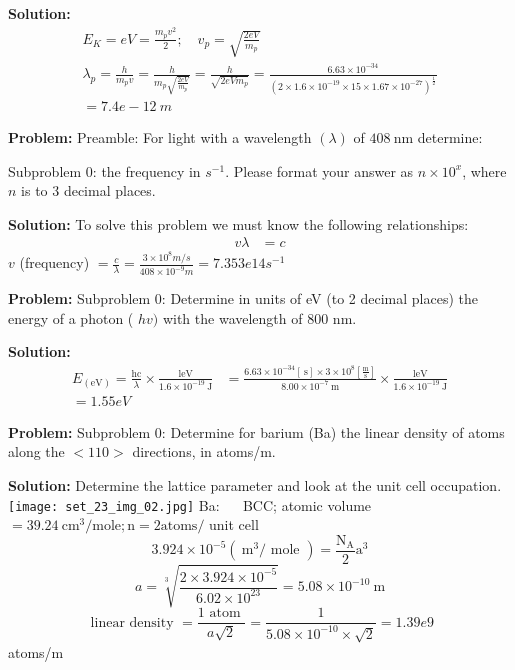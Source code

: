 \documentclass[10pt]{article}
\begin{document}
\textbf{Solution:}
\[
\begin{gathered}
E_{{K}}={eV}=\frac{{m}_{{p}} {v}^{2}}{2} ; \quad {v}_{{p}}=\sqrt{\frac{2 {eV}}{{m}_{{p}}}} \\
\lambda_{{p}}=\frac{{h}}{{m}_{{p}} {v}}=\frac{{h}}{{m}_{{p}} \sqrt{\frac{2 {eV}}{{m}_{{p}}}}}=\frac{{h}}{\sqrt{2 {eVm_{p }}}}=\frac{6.63 \times 10^{-34}}{\left(2 \times 1.6 \times 10^{-19} \times 15 \times 1.67 \times 10^{-27}\right)^{\frac{1}{2}}}
\\
= \boxed{7.4e-12} {~m}
\end{gathered}
\]


\textbf{Problem:}
Preamble: For light with a wavelength $(\lambda)$ of $408 \mathrm{~nm}$ determine:

Subproblem 0: the frequency in $s^{-1}$. Please format your answer as $n \times 10^x$, where $n$ is to 3 decimal places. 


\textbf{Solution:}
To solve this problem we must know the following relationships:
\[
\begin{aligned}
v \lambda &=c
\end{aligned}
\]
$v$ (frequency) $=\frac{c}{\lambda}=\frac{3 \times 10^{8} m / s}{408 \times 10^{-9} m}= \boxed{7.353e14} s^{-1}$


\textbf{Problem:}
Subproblem 0: Determine in units of eV (to 2 decimal places) the energy of a photon ( $h v)$ with the wavelength of $800$ nm.


\textbf{Solution:}
\[
\begin{aligned}
E_{(\mathrm{eV})}=\frac{\mathrm{hc}}{\lambda} \times \frac{\mathrm{leV}}{1.6 \times 10^{-19} \mathrm{~J}} &=\frac{6.63 \times 10^{-34}[\mathrm{~s}] \times 3 \times 10^{8}\left[\frac{\mathrm{m}}{\mathrm{s}}\right]}{8.00 \times 10^{-7} \mathrm{~m}} \times \frac{\mathrm{leV}}{1.6 \times 10^{-19} \mathrm{~J}} \\
=\boxed{1.55} eV
\end{aligned}
\]


\textbf{Problem:}
Subproblem 0: Determine for barium (Ba) the linear density of atoms along the $<110>$ directions, in atoms/m.


\textbf{Solution:}
Determine the lattice parameter and look at the unit cell occupation.
\texttt{[image: set\_23\_img\_02.jpg]}
\nonessentialimage
Ba: $\quad$ BCC; atomic volume $=39.24 \mathrm{~cm}^{3} / \mathrm{mole} ; \mathrm{n}=2 \mathrm{atoms} /$ unit cell\\
$$
3.924 \times 10^{-5}\left(\mathrm{~m}^{3} / \text { mole }\right)=\frac{\mathrm{N}_{\mathrm{A}}}{2} \mathrm{a}^{3}
$$
$$
a=\sqrt[3]{\frac{2 \times 3.924 \times 10^{-5}}{6.02 \times 10^{23}}}=5.08 \times 10^{-10} \mathrm{~m}
$$
$$
\text { linear density }=\frac{1 \text { atom }}{a \sqrt{2}}=\frac{1}{5.08 \times 10^{-10} \times \sqrt{2}} = \boxed{1.39e9}
$$ atoms/m
\end{document}
